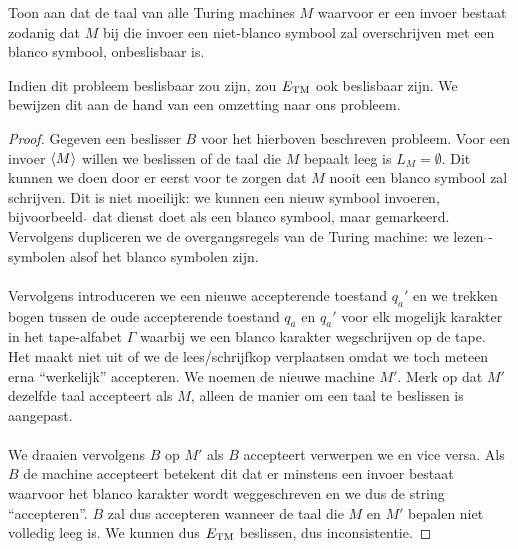 \documentclass[a4paper]{article}
\begin{document}
\begin{question}
Toon aan dat de taal van alle Turing machines $M$ waarvoor er een invoer bestaat zodanig dat $M$ bij die invoer een niet-blanco symbool zal overschrijven met een blanco symbool, onbeslisbaar is.
\begin{answer}
Indien dit probleem beslisbaar zou zijn, zou $E_{\rm TM}$ ook beslisbaar zijn. We bewijzen dit aan de hand van een omzetting naar ons probleem.
\begin{proof}
Gegeven een beslisser $B$ voor het hierboven beschreven probleem. Voor een invoer $\left\langle M \right\rangle$ willen we beslissen of de taal die $M$ bepaalt leeg is $L_M=\emptyset$. Dit kunnen we doen door er eerst voor te zorgen dat $M$ nooit een blanco symbool zal schrijven. Dit is niet moeilijk: we kunnen een nieuw symbool invoeren, bijvoorbeeld $\hat{}$ dat dienst doet als een blanco symbool, maar gemarkeerd. Vervolgens dupliceren we de overgangsregels van de Turing machine: we lezen $\hat{}$-symbolen alsof het blanco symbolen zijn.
\paragraph{}
Vervolgens introduceren we een nieuwe accepterende toestand $q_a'$ en we trekken bogen tussen de oude accepterende toestand $q_a$ en $q_a'$ voor elk mogelijk karakter in het tape-alfabet $\Gamma$ waarbij we een blanco karakter wegschrijven op de tape. Het maakt niet uit of we de lees/schrijfkop verplaatsen omdat we toch meteen erna ``werkelijk'' accepteren. We noemen de nieuwe machine $M'$. Merk op dat $M'$ dezelfde taal accepteert als $M$, alleen de manier om een taal te beslissen is aangepast.
\paragraph{}
We draaien vervolgens $B$ op $M'$ als $B$ accepteert verwerpen we en vice versa. Als $B$ de machine accepteert betekent dit dat er minstens een invoer bestaat waarvoor het blanco karakter wordt weggeschreven en we dus de string ``accepteren''. $B$ zal dus accepteren wanneer de taal die $M$ en $M'$ bepalen niet volledig leeg is. We kunnen dus $E_{\rm TM}$ beslissen, dus inconsistentie.
\end{proof}
\end{answer}
\end{question}
\end{document}
